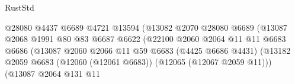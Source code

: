 \begin{lexlean}{RustStd}
\begin{coremodule}
                                                      @28080
                                                      @4437
                                                      @6689
                                                      @4721
                                                      @13594
                                                      (@13082
                                                        @2070
                                                        @28080
                                                        @6689
                                                        (@13087
                                                          @2068
                                                          @1991
                                                          @80
                                                          @83
                                                          @6687
                                                          @6622
                                                          (@22100
                                                            @2060
                                                            @2064
                                                            @11
                                                            @11
                                                            @6683
                                                            @6686
                                                            (@13087
                                                              @2060
                                                              @2066
                                                              @11
                                                              @59
                                                              @6683
                                                              (@4425 @6686 @4431)
                                                              (@13182
                                                                @2059
                                                                @6683
                                                                (@12060 (@12061 @6683))
                                                                (@12065 (@12067 @2059 @11)))
                                                              (@13087
                                                                @2064
                                                                @131
                                                                @11

\end{coremodule}
\end{lexlean}
